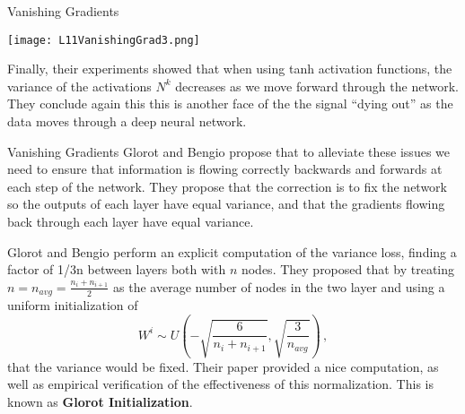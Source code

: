 \documentclass[10pt, table, dvipsnames,xcdraw,handout]{beamer}
\begin{document}
\begin{frame}[fragile]{Vanishing Gradients}
  \begin{minipage}[t][0.5\textheight][t]{\textwidth}
	\centering \texttt{[image: L11VanishingGrad3.png]} 
  \end{minipage}
  \vfill
\begin{minipage}[t][0.5\textheight][t]{\textwidth}
Finally, their experiments showed that when using tanh activation functions, the variance of the activations $N^k$ decreases as we move forward through the network. They conclude again this this is another face of the the signal ``dying out'' as the data moves through a deep neural network. 
\end{minipage}
\end{frame}


\begin{frame}[fragile]{Vanishing Gradients}
Glorot and Bengio propose that to alleviate these issues we need to ensure that information is flowing correctly backwards and forwards at each step of the network. They propose that the correction is to fix the network so the outputs of each layer have equal variance, and that the gradients flowing back through each layer have equal variance. 

Glorot and Bengio perform an explicit computation of the variance loss, finding a factor of 1/3n between layers both with $n$ nodes. They proposed that by treating $n = n_{avg} = \frac{n_i + n_{i+1}}2$ as the average number of nodes in the two layer and using a uniform initialization of 
$$
W^i \sim U\left( -\sqrt{\frac{6}{n_i + n_{i+1}}}, \sqrt{\frac{3}{n_{avg}}}  \right)\,,
$$
that the variance would be fixed. Their paper provided a nice computation, as well as empirical verification of the effectiveness of this normalization. This is known as \textbf{Glorot Initialization}.
\end{frame}
\end{document}
